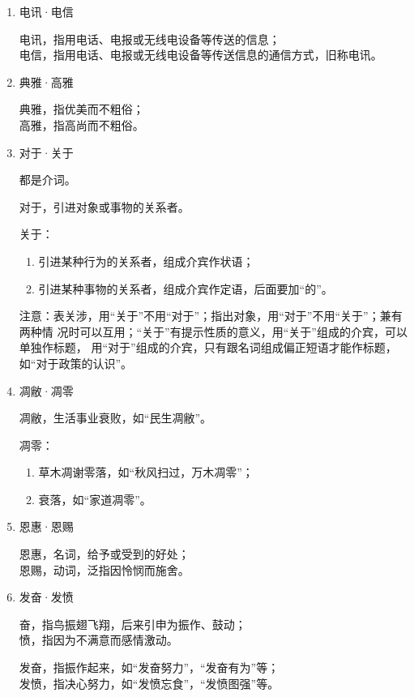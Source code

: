 \documentclass[final,oneside]{ctexbook}
\begin{document}
\begin{enumerate}
  \item 电讯·电信

    电讯，指用电话、电报或无线电设备等传送的信息；\\
    电信，指用电话、电报或无线电设备等传送信息的通信方式，旧称电讯。

  \item 典雅·高雅

    典雅，指优美而不粗俗；\\
    高雅，指高尚而不粗俗。

  \item 对于·关于

    都是介词。

    对于，引进对象或事物的关系者。

    关于：
    \begin{enumerate}
      \item 引进某种行为的关系者，组成介宾作状语；
      \item 引进某种事物的关系者，组成介宾作定语，后面要加“的”。
    \end{enumerate}

    注意：表关涉，用“关于”不用“对于”；指出对象，用“对于”不用“关于”；兼有两种情
    况时可以互用；“关于”有提示性质的意义，用“关于”组成的介宾，可以单独作标题，
    用“对于”组成的介宾，只有跟名词组成偏正短语才能作标题，如“对于政策的认识”。

  \item 凋敝·凋零

    凋敝，生活事业衰败，如“民生凋敝”。

    凋零：
    \begin{enumerate}
      \item 草木凋谢零落，如“秋风扫过，万木凋零”；
      \item 衰落，如“家道凋零”。
    \end{enumerate}

  \item 恩惠·恩赐

    恩惠，名词，给予或受到的好处；\\
    恩赐，动词，泛指因怜悯而施舍。

  \item 发奋·发愤

    奋，指鸟振翅飞翔，后来引申为振作、鼓动；\\
    愤，指因为不满意而感情激动。

    发奋，指振作起来，如“发奋努力”，“发奋有为”等；\\
    发愤，指决心努力，如“发愤忘食”，“发愤图强”等。


\end{enumerate}
\end{document}
